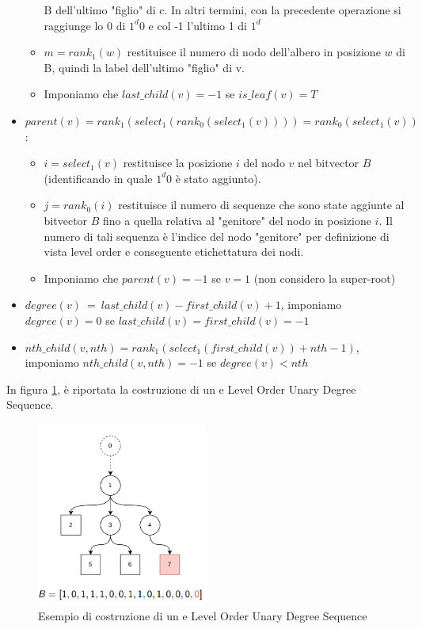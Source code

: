 \begin{itemize}
\begin{itemize}
                    B dell'ultimo "figlio" di c. In altri termini, con la
                    precedente operazione si raggiunge lo 0 di $1^d 0$ e col -1
                    l'ultimo 1 di $1^d$
              \item $m = rank_1(w)$ restituisce il numero di nodo dell'albero in
                    posizione $w$ di B, quindi la label dell'ultimo "figlio" di v.
              \item Imponiamo che $last\_child(v) = -1$ se $is\_leaf (v) = T$
          \end{itemize}
    \item $parent(v) = rank_1(select_1(rank_0(select_1(v)))) = rank_0(select_1(v))$:
          \begin{itemize}
              \item $i = select_1(v)$ restituisce la posizione $i$ del nodo $v$
                    nel bitvector $B$ (identificando in quale $1^d 0$ è stato
                    aggiunto).
              \item $j = rank_0(i)$ restituisce il numero di sequenze che sono
                    state aggiunte al bitvector $B$ fino a quella relativa al
                    "genitore" del nodo in posizione $i$. Il numero di tali
                    sequenza è l'indice del nodo "genitore" per definizione di
                    vista level order e conseguente etichettatura dei nodi.
              \item Imponiamo che $parent(v) = -1$ se $v = 1$ (non considero la
                    super-root)
          \end{itemize}
    \item $degree(v) \ = \ last\_child(v) - first\_child(v) + 1$, imponiamo 
          $degree(v) = 0$ se $last\_child(v) = first\_child(v) = -1$
    \item $nth\_child(v, nth) = rank_1(select_1(first\_child(v)) + nth - 1)$,
          imponiamo $nth\_child(v, nth) = -1$ se $degree(v) < nth$
\end{itemize}
\begin{esempio}
    In figura \ref{fig:louds}, è riportata la costruzione di un e Level Order
    Unary Degree Sequence.
    \begin{figure}[!ht]
        \centering
        \includegraphics[width=0.5\textwidth]{img/Strutture Dati/LOUDS.png}
        \caption{Esempio di costruzione di un e Level Order Unary Degree Sequence}
        \label{fig:louds}
    \end{figure}
\end{esempio}
